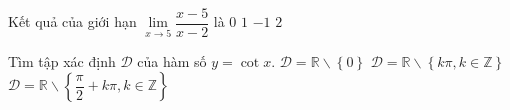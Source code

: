 \begin{ex}%
Kết quả của giới hạn $\lim\limits_{x\to 5} \dfrac{x-5}{x-2}$ là
\choice
{\True $0$}
{$1$}
{$-1$}
{$2$}
\end{ex}

\begin{ex}%
Tìm tập xác định $\mathscr{D}$ của hàm số $y=\cot x$.
{$\mathscr{D}=\mathbb{R}\backslash \left\{0\right\}$}
{\True $\mathscr{D}=\mathbb{R}\backslash \left\{k\pi, k\in \mathbb{Z}\right\}$}
{$\mathscr{D}=\mathbb{R}\backslash \left\{\dfrac{\pi}{2}+k\pi, k\in \mathbb{Z}\right\}$}
\end{ex}

